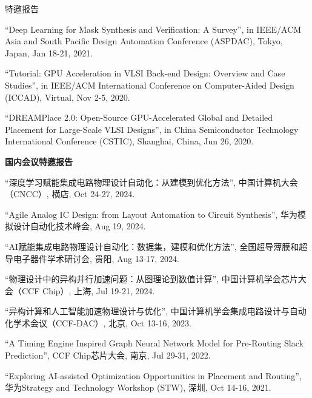 \begin{rSection}{特邀报告}
\begin{description}[font=\normalfont]
\item[{[3]}]{
``Deep Learning for Mask Synthesis and Verification: A Survey'', in IEEE/ACM Asia and South Pacific Design Automation Conference (ASPDAC), Tokyo, Japan, Jan 18-21, 2021.
}

\item[{[2]}]{
``Tutorial: GPU Acceleration in VLSI Back-end Design: Overview and Case Studies'', in IEEE/ACM International Conference on Computer-Aided Design (ICCAD), Virtual, Nov 2-5, 2020. 
}

\item[{[1]}]{
``DREAMPlace 2.0: Open-Source GPU-Accelerated Global and Detailed Placement for Large-Scale VLSI Designs'', in China Semiconductor Technology International Conference (CSTIC), Shanghai, China, Jun 26, 2020. 
}

\end{description}

\textbf{国内会议特邀报告}
        
\begin{description}[font=\normalfont]

\item[{[12]}]{
``深度学习赋能集成电路物理设计自动化：从建模到优化方法'', 中国计算机大会（CNCC）, 横店, Oct 24-27, 2024. 
}

\item[{[11]}]{
``Agile Analog IC Design: from Layout Automation to Circuit Synthesis'', 华为模拟设计自动化技术峰会, Aug 19, 2024. 
}

\item[{[10]}]{
``AI赋能集成电路物理设计自动化：数据集，建模和优化方法'', 全国超导薄膜和超导电子器件学术研讨会, 贵阳, Aug 13-17, 2024. 
}

\item[{[9]}]{
``物理设计中的异构并行加速问题：从图理论到数值计算'', 中国计算机学会芯片大会（CCF Chip）, 上海, Jul 19-21, 2024. 
}

\item[{[8]}]{
``异构计算和人工智能加速物理设计与优化'', 中国计算机学会集成电路设计与自动化学术会议（CCF-DAC）, 北京, Oct 13-16, 2023. 
}

\item[{[7]}]{
``A Timing Engine Inspired Graph Neural Network Model for Pre-Routing Slack Prediction'', CCF Chip芯片大会, 南京, Jul 29-31, 2022. 
}

\item[{[6]}]{
``Exploring AI-assisted Optimization Opportunities in Placement and Routing'', 华为Strategy and Technology Workshop (STW), 深圳, Oct 14-16, 2021. 
}


\end{description}
\end{rSection}
